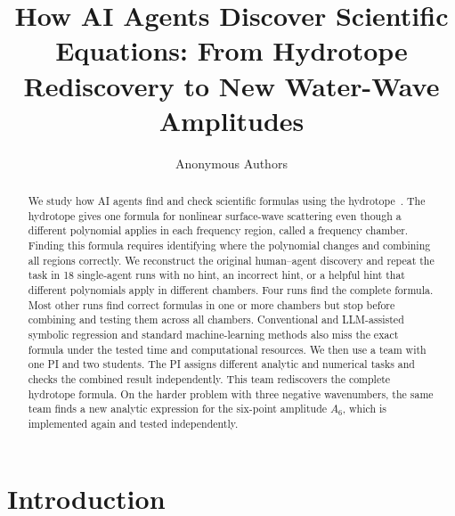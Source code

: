 \documentclass{article}
\title{How AI Agents Discover Scientific Equations: From Hydrotope Rediscovery to New Water-Wave Amplitudes}
\author{Anonymous Authors}
\begin{document}
\raggedbottom

\maketitle

\begin{abstract}
We study how AI agents find and check scientific formulas using the
hydrotope~\citep{Arkani-Hamed2026SurfaceWW}. The hydrotope gives one formula
for nonlinear surface-wave scattering even though a different polynomial
applies in each frequency region, called a frequency chamber. Finding this
formula requires identifying where the polynomial changes and combining all
regions correctly. We reconstruct the original human--agent discovery and
repeat the task in 18 single-agent runs with no hint, an incorrect hint, or a
helpful hint that different polynomials apply in different chambers. Four runs
find the complete formula.
Most other runs find correct formulas in one or more chambers but stop before
combining and testing them across all chambers. Conventional and LLM-assisted
symbolic regression and standard machine-learning methods also miss the exact
formula under the tested time and computational resources. We then use a team
with one PI and two students. The PI assigns different
analytic and numerical tasks and checks the combined result independently.
This team rediscovers the complete hydrotope formula. On the harder problem
with three negative wavenumbers, the same team finds a new analytic expression
for the six-point amplitude $A_6$, which is implemented again and tested
independently. \href{https://github.com/ZihanZhou26/hydrotope_benchmark}
{\faGithub}
\end{abstract}

\section{Introduction}
\end{document}

